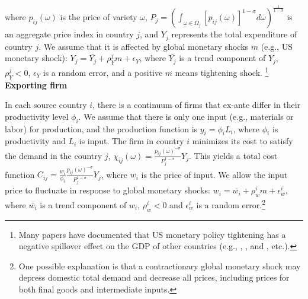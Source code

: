 where $p_{ij}(\omega)$ is the price of variety $\omega$, $P_j=(\int_{\omega \in \Omega_j} [p_{ij}(\omega)]^{1-\sigma} d \omega)^{\frac{1}{1-\sigma}}$ is an aggregate price index in country $j$, and $Y_j$ represents the total expenditure of country $j$. We assume that it is affected by global monetary shocks $m$ (e.g., US monetary shock): $Y_j=\bar{Y_j}+\rho_{Y}^j m+\epsilon_Y$, where $\bar{Y_j}$ is a trend component of $Y_j$, $\rho_{Y}^j<0$, $\epsilon_Y$ is a random error, and a positive $m$ means tightening shock. \footnote{Many papers have documented that US monetary policy tightening has a negative spillover effect on the GDP of other countries (e.g., \cite{kim2001international}, \cite{georgiadis2016determinants}, and \cite{iacoviello2019foreign}, etc.).} \\
 

\textbf{Exporting firm}

In each source country $i$, there is a continuum of firms that ex-ante differ in their productivity level $\phi_i$. We assume that there is only one input (e.g., materials or labor) for production, and the production function is $ y_i= \phi_i L_i$, where $\phi_i$ is productivity and $L_i$ is input. The firm in country $i$ minimizes its cost to satisfy the demand in the country $j$, $\chi_{ij}(\omega)=\frac{p_{ij}(\omega)^{-\sigma}}{P_j^{1-\sigma}} Y_j$. This yields a total cost function $ C_{ij}=\frac{w_i}{\phi_i} \frac{p_{ij}(\omega)^{-\sigma}}{P_j^{1-\sigma}} Y_j$, where $w_i$ is the price of input. We allow the input price to fluctuate in response to global monetary shocks: $w_i=\bar{w_i}+\rho_w^i m + \epsilon_w^i$, where $\bar{w_i}$ is a trend component of $w_i$, $\rho_w^i<0$ and $\epsilon_w^i$ is a random error.\footnote{One possible explanation is that a contractionary global monetary shock may depress domestic total demand and decrease all prices, including prices for both final goods and intermediate inputs.} 

